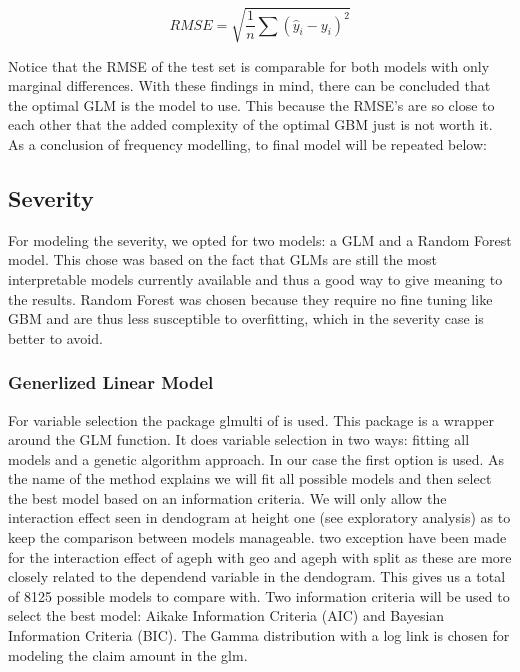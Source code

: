 \documentclass[
  12pt,
]{article}
\begin{document}
\[RMSE = \sqrt{\frac{1}{n}\sum(\hat y_i - y_i)^2} \]

Notice that the RMSE of the test set is comparable for both models with
only marginal differences. With these findings in mind, there can be
concluded that the optimal GLM is the model to use. This because the
RMSE's are so close to each other that the added complexity of the
optimal GBM just is not worth it. As a conclusion of frequency
modelling, to final model will be repeated below:

\hypertarget{severity-1}{%
\subsection{Severity}\label{severity-1}}

For modeling the severity, we opted for two models: a GLM and a Random
Forest model. This chose was based on the fact that GLMs are still the
most interpretable models currently available and thus a good way to
give meaning to the results. Random Forest was chosen because they
require no fine tuning like GBM and are thus less susceptible to
overfitting, which in the severity case is better to avoid.

\hypertarget{generlized-linear-model}{%
\subsubsection{Generlized Linear Model}\label{generlized-linear-model}}

For variable selection the package glmulti of
\citet{calcagno2010glmulti} is used. This package is a wrapper around
the GLM function. It does variable selection in two ways: fitting all
models and a genetic algorithm approach. In our case the first option is
used. As the name of the method explains we will fit all possible models
and then select the best model based on an information criteria. We will
only allow the interaction effect seen in dendogram at height one (see
exploratory analysis) as to keep the comparison between models
manageable. two exception have been made for the interaction effect of
ageph with geo and ageph with split as these are more closely related to
the dependend variable in the dendogram. This gives us a total of 8125
possible models to compare with. Two information criteria will be used
to select the best model: Aikake Information Criteria (AIC) and Bayesian
Information Criteria (BIC). The Gamma distribution with a log link is
chosen for modeling the claim amount in the glm.
\end{document}
